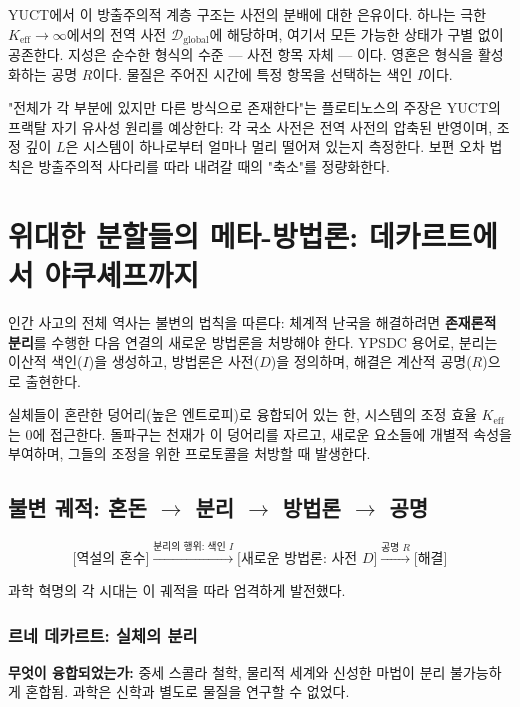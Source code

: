 \documentclass[12pt,a4paper]{article}
\begin{document}
	YUCT에서 이 방출주의적 계층 구조는 사전의 분배에 대한 은유이다. 하나는 극한 \(K_{\mathrm{eff}} \to \infty\)에서의 전역 사전 \(\mathcal{D}_{\text{global}}\)에 해당하며, 여기서 모든 가능한 상태가 구별 없이 공존한다. 지성은 순수한 형식의 수준 — 사전 항목 자체 — 이다. 영혼은 형식을 활성화하는 공명 \(R\)이다. 물질은 주어진 시간에 특정 항목을 선택하는 색인 \(I\)이다.
	
	"전체가 각 부분에 있지만 다른 방식으로 존재한다"는 플로티노스의 주장은 YUCT의 프랙탈 자기 유사성 원리를 예상한다: 각 국소 사전은 전역 사전의 압축된 반영이며, 조정 깊이 \(L\)은 시스템이 하나로부터 얼마나 멀리 떨어져 있는지 측정한다. 보편 오차 법칙은 방출주의적 사다리를 따라 내려갈 때의 "축소"를 정량화한다.
	
	\section{위대한 분할들의 메타-방법론: 데카르트에서 야쿠셰프까지}
	
	인간 사고의 전체 역사는 불변의 법칙을 따른다: 체계적 난국을 해결하려면 \textbf{존재론적 분리}를 수행한 다음 연결의 새로운 방법론을 처방해야 한다. YPSDC 용어로, 분리는 이산적 색인(\(I\))을 생성하고, 방법론은 사전(\(D\))을 정의하며, 해결은 계산적 공명(\(R\))으로 출현한다.
	
	실체들이 혼란한 덩어리(높은 엔트로피)로 융합되어 있는 한, 시스템의 조정 효율 \(K_{\mathrm{eff}}\)는 0에 접근한다. 돌파구는 천재가 이 덩어리를 자르고, 새로운 요소들에 개별적 속성을 부여하며, 그들의 조정을 위한 프로토콜을 처방할 때 발생한다.
	
	\subsection{불변 궤적: 혼돈 \(\rightarrow\) 분리 \(\rightarrow\) 방법론 \(\rightarrow\) 공명}
	
	\[
	\text{[역설의 혼수]} \xrightarrow{\text{분리의 행위: 색인 } I} \text{[새로운 방법론: 사전 } D\text{]} \xrightarrow{\text{공명 } R} \text{[해결]}
	\]
	
	과학 혁명의 각 시대는 이 궤적을 따라 엄격하게 발전했다.
	
	\subsubsection{르네 데카르트: 실체의 분리}
	
	\textbf{무엇이 융합되었는가:} 중세 스콜라 철학, 물리적 세계와 신성한 마법이 분리 불가능하게 혼합됨. 과학은 신학과 별도로 물질을 연구할 수 없었다.
	
\end{document}
